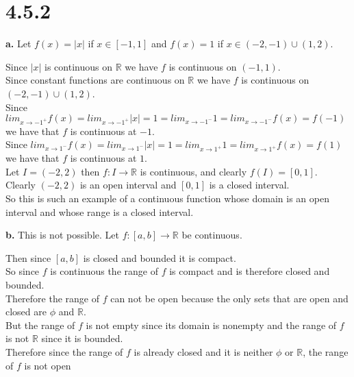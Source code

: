 \documentclass{article}
\begin{document}
\newpage
\section*{4.5.2}

{\Large\textbf{a.}} Let $f(x) = |x|$ if $x\in [-1, 1]$ and $f(x) = 1$ if $x\in (-2, -1)\cup (1, 2)$.
\begin{center}
    \doublespacing
    Since $|x|$ is continuous on $\mathbb{R}$ we have $f$ is continuous on $(-1, 1)$.
    \\Since constant functions are continuous on $\mathbb{R}$ we have $f$ is continuous on $(-2, -1)\cup (1, 2)$.
    \\Since $lim _{x\rightarrow {-1}^+} f(x) = lim _{x\rightarrow {-1}^+} |x| = 1 = lim_{x\rightarrow {-1}^-} 1 = lim_{x\rightarrow {-1}^-} f(x) = f(-1)$ we have that $f$ is continuous at $-1$.
    \\Since $lim _{x\rightarrow {1}^-} f(x) = lim _{x\rightarrow {1}^-} |x| = 1 = lim_{x\rightarrow {1}^+} 1 = lim_{x\rightarrow {1}^+} f(x) = f(1)$ we have that $f$ is continuous at $1$.
    \\Let $I = (-2, 2)$ then $f: I\rightarrow\mathbb{R}$ is continuous, and clearly $f(I) = [0, 1]$.
    \\Clearly $(-2, 2)$ is an open interval and $[0, 1]$ is a closed interval.
    \\So this is such an example of a continuous function whose domain is an open interval and whose range is a closed interval.
\end{center}


{\Large\textbf{b.}} This is not possible. Let $f: [a, b]\rightarrow\mathbb{R}$ be continuous.
\begin{center}
    \doublespacing
    Then since $[a, b]$ is closed and bounded it is compact.
    \\So since $f$ is continuous the range of $f$ is compact and is therefore closed and bounded.
    \\Therefore the range of $f$ can not be open because the only sets that are open and closed are $\phi$ and $\mathbb{R}$.
    \\But the range of $f$ is not empty since its domain is nonempty and the range of $f$ is not $\mathbb{R}$ since it is bounded.
    \\Therefore since the range of $f$ is already closed and it is neither $\phi$ or $\mathbb{R}$, the range of $f$ is not open \qedsymbol
\end{center}
\end{document}
